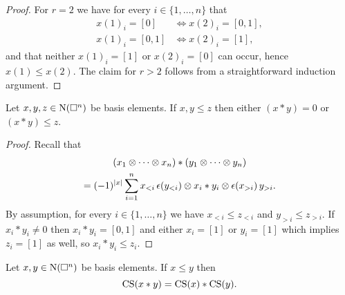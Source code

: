 \begin{proof}
	For $r = 2$ we have for every $i \in \{1, \dots, n\}$ that
	\begin{align*}
		x(1)_i = [0]   & \iff x(2)_i = [0,1], \\
		x(1)_i = [0,1] & \iff x(2)_i = [1],
	\end{align*}
	and that neither $x(1)_i = [1]$ or $x(2)_i = [0]$ can occur, hence $x(1) \leq x(2)$.
	The claim for $r > 2$ follows from a straightforward induction argument.
\end{proof}

\begin{lemma}
	Let $x, y, z \in \operatorname{N}(\square^n)$ be basis elements.
	If $x, y \leq z$ then either $(x \ast y) = 0$ or $(x \ast y) \leq z$.
\end{lemma}

\begin{proof}
	Recall that
	\begin{multline*}
		(x_1 \otimes \cdots \otimes x_n) \ast (y_1 \otimes \cdots \otimes y_n) \\ =
		(-1)^{|x|} \sum_{i=1}^n x_{<i}\, \epsilon(y_{<i}) \otimes x_i \ast y_i \otimes \epsilon(x_{>i}) \, y_{>i}.
	\end{multline*}
	By assumption, for every $i \in \{1, \dots, n\}$ we have $x_{<i} \leq z_{<i}$ and $y_{>i} \leq z_{>i}$.
	If $x_i \ast y_i \neq 0$ then $x_i \ast y_i = [0,1]$ and either $x_i = [1]$ or $y_i = [1]$ which implies $z_i = [1]$ as well, so $x_i \ast y_i \leq z_i$.
\end{proof}

\begin{lemma}
	Let $x, y \in \operatorname{N}(\square^n)$ be basis elements.
	If $x \leq y$ then
	\begin{equation} \label{e:cs collapse as algebra map}
		\operatorname{CS}(x \ast y) = \operatorname{CS}(x) \ast \operatorname{CS}(y).
	\end{equation}
\end{lemma}

